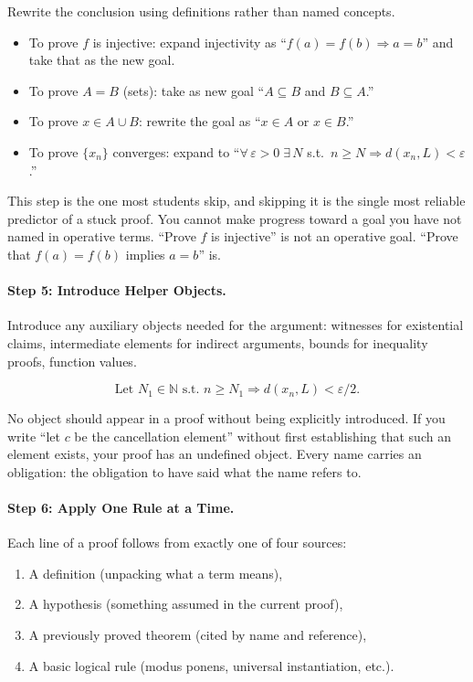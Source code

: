 Rewrite the conclusion using definitions rather than named concepts.
\begin{itemize}[itemsep=2pt]
  \item To prove $f$ is injective: expand injectivity as
    ``$f(a) = f(b) \Rightarrow a = b$'' and take that as the new goal.
  \item To prove $A = B$ (sets): take as new goal
    ``$A \subseteq B$ and $B \subseteq A$.''
  \item To prove $x \in A \cup B$: rewrite the goal as ``$x \in A$
    or $x \in B$.''
  \item To prove $\{x_n\}$ converges: expand to
    ``$\forall\, \varepsilon > 0\; \exists\, N$ s.t.\ $n \geq N
    \Rightarrow d(x_n, L) < \varepsilon$.''
\end{itemize}

This step is the one most students skip, and skipping it is the single
most reliable predictor of a stuck proof. You cannot make progress toward
a goal you have not named in operative terms. ``Prove $f$ is injective''
is not an operative goal. ``Prove that $f(a) = f(b)$ implies $a = b$''
is.

\paragraph{Step 5: Introduce Helper Objects.}

Introduce any auxiliary objects needed for the argument: witnesses
for existential claims, intermediate elements for indirect arguments,
bounds for inequality proofs, function values.

\[
\text{Let } N_1 \in \mathbb{N} \text{ s.t.\ } n \geq N_1
\Rightarrow d(x_n, L) < \varepsilon/2.
\]

No object should appear in a proof without being explicitly introduced.
If you write ``let $c$ be the cancellation element'' without first
establishing that such an element exists, your proof has an undefined
object. Every name carries an obligation: the obligation to have said
what the name refers to.

\paragraph{Step 6: Apply One Rule at a Time.}

Each line of a proof follows from exactly one of four sources:
\begin{enumerate}[itemsep=2pt]
  \item A definition (unpacking what a term means),
  \item A hypothesis (something assumed in the current proof),
  \item A previously proved theorem (cited by name and reference),
  \item A basic logical rule (modus ponens, universal instantiation, etc.).
\end{enumerate}

